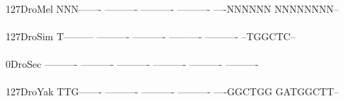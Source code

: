 \documentclass[11pt,twoside,reqno,a4paper]{article}
\begin{document}
{\\
127\hspace*{1\charwidth}DroMel	NNN-------	----------	----------	----------	----NNNNNN	NNNNNNNN--	\\
\hspace*{4\charwidth}\hspace*{7\charwidth}\hspace*{1\charwidth}\hspace*{1\charwidth}\hspace*{1\charwidth}\hspace*{1\charwidth}\hspace*{1\charwidth}\hspace*{1\charwidth}\\
127\hspace*{1\charwidth}DroSim	T---------	----------	----------	----------	----------	--TGGCTC--	\\
\hspace*{4\charwidth}\hspace*{7\charwidth}\hspace*{1\charwidth}\hspace*{1\charwidth}\hspace*{1\charwidth}\hspace*{1\charwidth}\hspace*{1\charwidth}\hspace*{1\charwidth}\\
0\hspace*{3\charwidth}DroSec	----------	----------	----------	----------	----------	----------	\\
\hspace*{4\charwidth}\hspace*{7\charwidth}\hspace*{1\charwidth}\hspace*{1\charwidth}\hspace*{1\charwidth}\hspace*{1\charwidth}\hspace*{1\charwidth}\hspace*{1\charwidth}\\
127\hspace*{1\charwidth}DroYak	TTG-------	----------	----------	----------	----GGCTGG	GATGGCTT--	\\
\hspace*{4\charwidth}\hspace*{7\charwidth}\hspace*{1\charwidth}\hspace*{1\charwidth}\hspace*{1\charwidth}\hspace*{1\charwidth}\hspace*{1\charwidth}\hspace*{1\charwidth}\\
}
\end{document}
